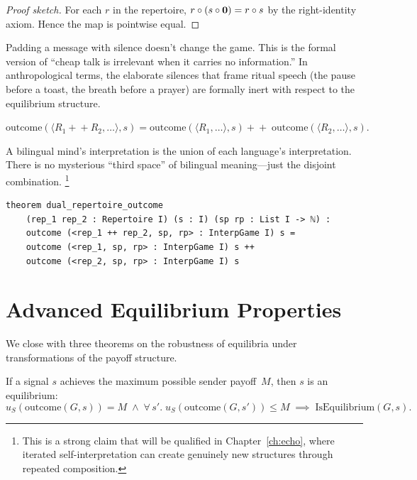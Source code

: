 \begin{proof}[Proof sketch]
For each $r$ in the repertoire, $r\circ(s\circ\mathbf{0}) = r\circ s$
by the right-identity axiom.  Hence the map is pointwise equal.
\end{proof}

Padding a message with silence doesn't change the game.  This is the formal
version of ``cheap talk is irrelevant when it carries no information.''  In
anthropological terms, the elaborate silences that frame ritual speech
(the pause before a toast, the breath before a prayer) are formally inert
with respect to the equilibrium structure.

\begin{theorem}
\label{thm:dual-repertoire}
$\mathrm{outcome}(\langle R_1\!+\!+\!R_2, \ldots\rangle, s)
= \mathrm{outcome}(\langle R_1,\ldots\rangle, s)
\!+\!+\;\mathrm{outcome}(\langle R_2,\ldots\rangle, s).$
\end{theorem}

A bilingual mind's interpretation is the union of each language's
interpretation.  There is no mysterious ``third space'' of bilingual
meaning---just the disjoint combination.%
\footnote{This is a strong claim that will be qualified in
Chapter~\ref{ch:echo}, where iterated self-interpretation can create
genuinely new structures through repeated composition.}

\begin{lstlisting}[caption={Dual repertoire combination in Lean~4.}]
theorem dual_repertoire_outcome
    (rep_1 rep_2 : Repertoire I) (s : I) (sp rp : List I -> ℕ) :
    outcome (<rep_1 ++ rep_2, sp, rp> : InterpGame I) s =
    outcome (<rep_1, sp, rp> : InterpGame I) s ++
    outcome (<rep_2, sp, rp> : InterpGame I) s
\end{lstlisting}


\section{Advanced Equilibrium Properties}
\label{sec:eq-advanced}

We close with three theorems on the robustness of equilibria under
transformations of the payoff structure.

\begin{theorem}
\label{thm:max-payoff-equilibrium}
If a signal $s$ achieves the maximum possible sender payoff~$M$,
then $s$ is an equilibrium:
\[
  u_S(\mathrm{outcome}(G,s)) = M
  \;\wedge\;
  \forall\,s'.\; u_S(\mathrm{outcome}(G,s')) \le M
  \;\implies\;
  \mathrm{IsEquilibrium}(G,s).
\]
\end{theorem}

